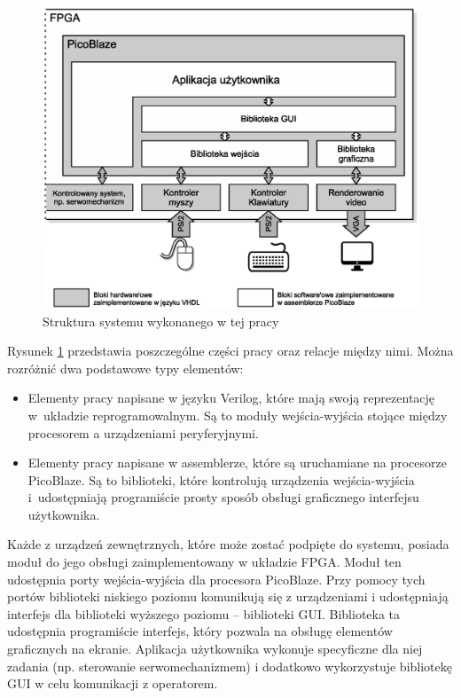 \begin{figure}[htb]
	\centering
	\includegraphics[width=16cm]{obrazki/struktura.eps}
	\caption{Struktura systemu wykonanego w tej pracy}
	\label{struktura}
\end{figure}

Rysunek \ref{struktura} przedstawia poszczególne części pracy oraz relacje między nimi. Można rozróżnić dwa podstawowe typy elementów:
\begin{itemize}
\item Elementy pracy napisane w języku Verilog, które mają swoją reprezentację w~układzie reprogramowalnym. Są to moduły wejścia-wyjścia stojące między procesorem a urządzeniami peryferyjnymi.
\item Elementy pracy napisane w assemblerze, które są uruchamiane na procesorze PicoBlaze. Są to biblioteki, które kontrolują urządzenia wejścia-wyjścia i~udostępniają programiście prosty sposób obsługi graficznego interfejsu użytkownika.
\end{itemize}

Każde z urządzeń zewnętrznych, które może zostać podpięte do systemu, posiada moduł do jego obsługi zaimplementowany w układzie FPGA. Moduł ten udostępnia porty wejścia-wyjścia dla procesora PicoBlaze. Przy pomocy tych portów biblioteki niskiego poziomu komunikują się z urządzeniami i udostępniają interfejs dla biblioteki wyższego poziomu -- biblioteki GUI. Biblioteka ta udostępnia programiście interfejs, który pozwala na obsługę elementów graficznych na ekranie. Aplikacja użytkownika wykonuje specyficzne dla niej zadania (np. sterowanie serwomechanizmem) i dodatkowo wykorzystuje bibliotekę GUI w celu komunikacji z operatorem.

